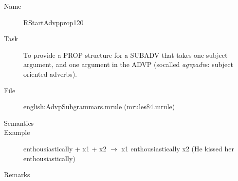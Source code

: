 \begin{description}
\vspace{1 cm}
\begin{description}
\item[Name] RStartAdvpprop120
\item[Task] To provide a PROP structure for a SUBADV that takes one subject 
argument, and one argument in the ADVP (socalled {\em agvpadv\/}s: subject 
oriented adverbs). 
\item[File] english:AdvpSubgrammars.mrule (mrules84.mrule)
\item[Semantics]
\item[Example] enthousiastically + x1 + x2 $\rightarrow$ x1 enthousiastically 
x2 (He kissed her enthousiastically)
\item[Remarks]
\end{description}

\end{description}

\newpage
